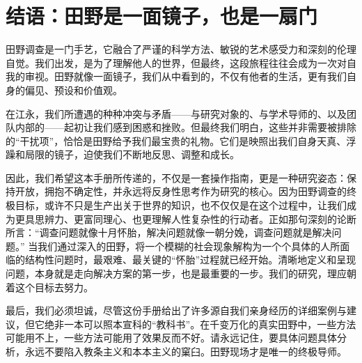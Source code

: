 \documentclass[UTF8]{ctexart}
\begin{document}
\newpage

\section*{结语：田野是一面镜子，也是一扇门}

田野调查是一门手艺，它融合了严谨的科学方法、敏锐的艺术感受力和深刻的伦理自觉。我们出发，是为了理解他人的世界，但最终，这段旅程往往会成为一次对自我的审视。田野就像一面镜子，我们从中看到的，不仅有他者的生活，更有我们自身的偏见、预设和价值观。

在江永，我们所遭遇的种种冲突与矛盾——与研究对象的、与学术导师的、以及团队内部的——起初让我们感到困惑和挫败。但最终我们明白，这些并非需要被排除的“干扰项”，恰恰是田野给予我们最宝贵的礼物。它们是映照出我们自身天真、浮躁和局限的镜子，迫使我们不断地反思、调整和成长。

因此，我们希望这本手册所传递的，不仅是一套操作指南，更是一种研究姿态：保持开放，拥抱不确定性，并永远将反身性思考作为研究的核心。因为田野调查的终极目标，或许不只是生产出关于世界的知识，也不仅仅是在这个过程中，让我们成为更具思辨力、更富同理心、也更理解人性复杂性的行动者。正如那句深刻的论断所言：“调查问题就像十月怀胎，解决问题就像一朝分娩，调查问题就是解决问题。” 当我们通过深入的田野，将一个模糊的社会现象解构为一个个具体的人所面临的结构性问题时，最艰难、最关键的“怀胎”过程就已经开始。清晰地定义和呈现问题，本身就是走向解决方案的第一步，也是最重要的一步。我们的研究，理应朝着这个目标去努力。

最后，我们必须坦诚，尽管这份手册给出了许多源自我们亲身经历的详细案例与建议，但它绝非一本可以照本宣科的“教科书”。在千变万化的真实田野中，一些方法可能用不上，一些方法可能用了效果反而不好。请永远记住，要具体问题具体分析，永远不要陷入教条主义和本本主义的窠臼。田野现场才是唯一的终极导师。
\end{document}
